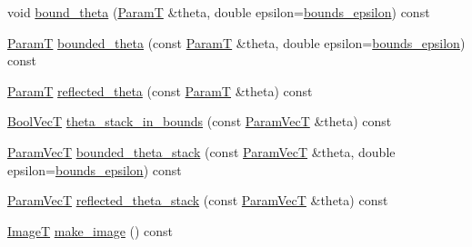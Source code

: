 \begin{DoxyCompactItemize}
\item 
void \hyperlink{classmappel_1_1PointEmitterModel_a789dfcc9ea1df17a0282fca5705ade85}{bound\+\_\+theta} (\hyperlink{classmappel_1_1PointEmitterModel_a665ec6aea3aac139bb69a23c06d4b9a1}{ParamT} \&theta, double epsilon=\hyperlink{classmappel_1_1PointEmitterModel_ac987a119137b85a27704b1c40e3fab8c}{bounds\+\_\+epsilon}) const 
\item 
\hyperlink{classmappel_1_1PointEmitterModel_a665ec6aea3aac139bb69a23c06d4b9a1}{ParamT} \hyperlink{classmappel_1_1PointEmitterModel_ac342b21db8970dfa0b2809ffe5e73d06}{bounded\+\_\+theta} (const \hyperlink{classmappel_1_1PointEmitterModel_a665ec6aea3aac139bb69a23c06d4b9a1}{ParamT} \&theta, double epsilon=\hyperlink{classmappel_1_1PointEmitterModel_ac987a119137b85a27704b1c40e3fab8c}{bounds\+\_\+epsilon}) const 
\item 
\hyperlink{classmappel_1_1PointEmitterModel_a665ec6aea3aac139bb69a23c06d4b9a1}{ParamT} \hyperlink{classmappel_1_1PointEmitterModel_a7dd386776870462e8f20c646b6fed1e3}{reflected\+\_\+theta} (const \hyperlink{classmappel_1_1PointEmitterModel_a665ec6aea3aac139bb69a23c06d4b9a1}{ParamT} \&theta) const 
\item 
\hyperlink{namespacemappel_a167d761ecce3cafb6f98c00c16bdb523}{Bool\+VecT} \hyperlink{classmappel_1_1PointEmitterModel_a7b6a59b4bc796b440025cffb7a6159f8}{theta\+\_\+stack\+\_\+in\+\_\+bounds} (const \hyperlink{classmappel_1_1PointEmitterModel_add253b568d763f1513a810aac35de719}{Param\+VecT} \&theta) const 
\item 
\hyperlink{classmappel_1_1PointEmitterModel_add253b568d763f1513a810aac35de719}{Param\+VecT} \hyperlink{classmappel_1_1PointEmitterModel_a6671c06d391ae9a09dd5de78dcc636fe}{bounded\+\_\+theta\+\_\+stack} (const \hyperlink{classmappel_1_1PointEmitterModel_add253b568d763f1513a810aac35de719}{Param\+VecT} \&theta, double epsilon=\hyperlink{classmappel_1_1PointEmitterModel_ac987a119137b85a27704b1c40e3fab8c}{bounds\+\_\+epsilon}) const 
\item 
\hyperlink{classmappel_1_1PointEmitterModel_add253b568d763f1513a810aac35de719}{Param\+VecT} \hyperlink{classmappel_1_1PointEmitterModel_ae24c17017ff5e37e1dd9ea9a1aeefa7f}{reflected\+\_\+theta\+\_\+stack} (const \hyperlink{classmappel_1_1PointEmitterModel_add253b568d763f1513a810aac35de719}{Param\+VecT} \&theta) const 
\item 
\hyperlink{classmappel_1_1ImageFormat1DBase_a521a1ff391a52a636fac4aac7c7ba02c}{ImageT} \hyperlink{classmappel_1_1ImageFormat1DBase_afa59b2dd9ba997262fa17ef7d1122996}{make\+\_\+image} () const 

\end{DoxyCompactItemize}
